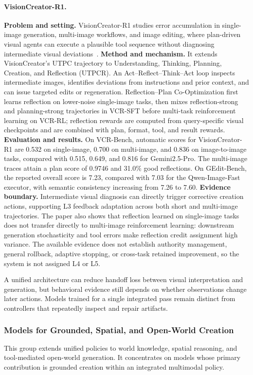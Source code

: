 \paragraph{VisionCreator-R1.}
\textbf{Problem and setting.} VisionCreator-R1 studies error accumulation in single-image generation, multi-image workflows, and image editing, where plan-driven visual agents can execute a plausible tool sequence without diagnosing intermediate visual deviations~\cite{avg260308812}. \textbf{Method and mechanism.} It extends VisionCreator's UTPC trajectory to Understanding, Thinking, Planning, Creation, and Reflection (UTPCR). An Act--Reflect--Think--Act loop inspects intermediate images, identifies deviations from instructions and prior context, and can issue targeted edits or regeneration. Reflection--Plan Co-Optimization first learns reflection on lower-noise single-image tasks, then mixes reflection-strong and planning-strong trajectories in VCR-SFT before multi-task reinforcement learning on VCR-RL; reflection rewards are computed from query-specific visual checkpoints and are combined with plan, format, tool, and result rewards. \textbf{Evaluation and results.} On VCR-Bench, automatic scores for VisionCreator-R1 are 0.532 on single-image, 0.700 on multi-image, and 0.836 on image-to-image tasks, compared with 0.515, 0.649, and 0.816 for Gemini2.5-Pro. The multi-image traces attain a plan score of 0.9746 and 31.0\% good reflections. On GEdit-Bench, the reported overall score is 7.23, compared with 7.03 for the Qwen-Image-Fast executor, with semantic consistency increasing from 7.26 to 7.60. \textbf{Evidence boundary.} Intermediate visual diagnosis can directly trigger corrective creation actions, supporting L3 feedback adaptation across both short and multi-image trajectories. The paper also shows that reflection learned on single-image tasks does not transfer directly to multi-image reinforcement learning: downstream generation stochasticity and tool errors make reflection credit assignment high variance. The available evidence does not establish authority management, general rollback, adaptive stopping, or cross-task retained improvement, so the system is not assigned L4 or L5.

A unified architecture can reduce handoff loss between visual interpretation and generation, but behavioral evidence still depends on whether observations change later actions. Models trained for a single integrated pass remain distinct from controllers that repeatedly inspect and repair artifacts.

\subsubsection{Models for Grounded, Spatial, and Open-World Creation}
This group extends unified policies to world knowledge, spatial reasoning, and tool-mediated open-world generation. It concentrates on models whose primary contribution is grounded creation within an integrated multimodal policy.

